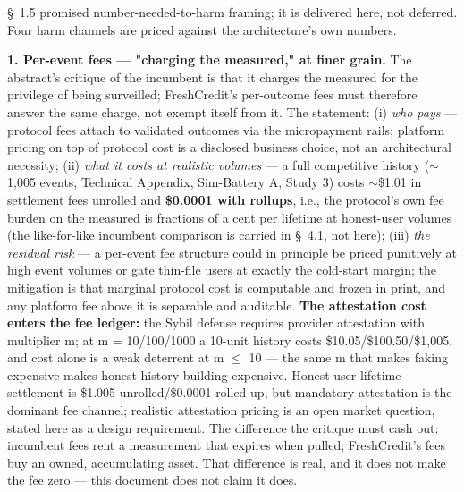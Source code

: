 \documentclass[11pt,twocolumn]{article}
\begin{document}
\S~1.5 promised number-needed-to-harm framing; it is delivered here, not deferred. Four harm channels are priced against the architecture's own numbers.

\textbf{1. Per-event fees --- "charging the measured," at finer grain.} The abstract's critique of the incumbent is that it charges the measured for the privilege of being surveilled; FreshCredit's per-outcome fees must therefore answer the same charge, not exempt itself from it. The statement: (i) \emph{who pays} --- protocol fees attach to validated outcomes via the micropayment rails; platform pricing on top of protocol cost is a disclosed business choice, not an architectural necessity; (ii) \emph{what it costs at realistic volumes} --- a full competitive history ($\sim$1,005 events, Technical Appendix, Sim-Battery A, Study 3) costs $\sim$\$1.01 in settlement fees unrolled and \textbf{\$0.0001 with rollups}, i.e., the protocol's own fee burden on the measured is fractions of a cent per lifetime at honest-user volumes (the like-for-like incumbent comparison is carried in \S~4.1, not here); (iii) \emph{the residual risk} --- a per-event fee structure could in principle be priced punitively at high event volumes or gate thin-file users at exactly the cold-start margin; the mitigation is that marginal protocol cost is computable and frozen in print, and any platform fee above it is separable and auditable. \textbf{The attestation cost enters the fee ledger:} the Sybil defense requires provider attestation with multiplier m; at m = 10/100/1000 a 10-unit history costs \$10.05/\$100.50/\$1,005, and cost alone is a weak deterrent at m $\leq$ 10 --- the same m that makes faking expensive makes honest history-building expensive. Honest-user lifetime settlement is \$1.005 unrolled/\$0.0001 rolled-up, but mandatory attestation is the dominant fee channel; realistic attestation pricing is an open market question, stated here as a design requirement. The difference the critique must cash out: incumbent fees rent a measurement that expires when pulled; FreshCredit's fees buy an owned, accumulating asset. That difference is real, and it does not make the fee zero --- this document does not claim it does.
\end{document}
